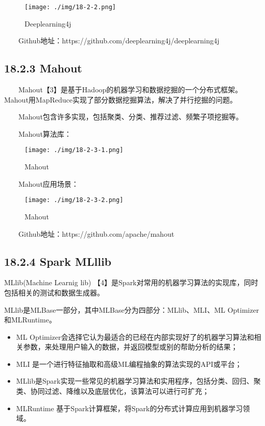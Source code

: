 \begin{figure}
\centering
\texttt{[image: ./img/18-2-2.png]}
\caption{Deeplearning4j}
\end{figure}

  Github地址：https://github.com/deeplearning4j/deeplearning4j

\subsection{18.2.3 Mahout}\label{mahout}

  Mahout【3】是基于Hadoop的机器学习和数据挖掘的一个分布式框架。Mahout用MapReduce实现了部分数据挖掘算法，解决了并行挖掘的问题。

  Mahout包含许多实现，包括聚类、分类、推荐过滤、频繁子项挖掘等。

  Mahout算法库：

\begin{figure}
\centering
\texttt{[image: ./img/18-2-3-1.png]}
\caption{Mahout}
\end{figure}

  Mahout应用场景：

\begin{figure}
\centering
\texttt{[image: ./img/18-2-3-2.png]}
\caption{Mahout}
\end{figure}

  Github地址：https://github.com/apache/mahout

\subsection{18.2.4 Spark MLllib}\label{spark-mlllib}

MLlib(Machine Learnig lib)
【4】是Spark对常用的机器学习算法的实现库，同时包括相关的测试和数据生成器。

MLlib是MLBase一部分，其中MLBase分为四部分：MLlib、MLI、ML
Optimizer和MLRuntime。

\begin{itemize}
\item
  ML
  Optimizer会选择它认为最适合的已经在内部实现好了的机器学习算法和相关参数，来处理用户输入的数据，并返回模型或别的帮助分析的结果；
\item
  MLI 是一个进行特征抽取和高级ML编程抽象的算法实现的API或平台；
\item
  MLlib是Spark实现一些常见的机器学习算法和实用程序，包括分类、回归、聚类、协同过滤、降维以及底层优化，该算法可以进行可扩充；
\item
  MLRuntime 基于Spark计算框架，将Spark的分布式计算应用到机器学习领域。
\end{itemize}

